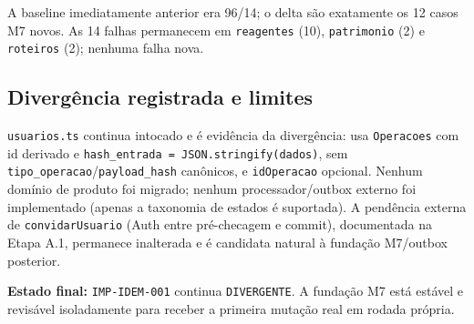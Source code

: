 A baseline imediatamente anterior era 96/14; o delta são exatamente os 12 casos
M7 novos. As 14 falhas permanecem em \texttt{reagentes} (10),
\texttt{patrimonio} (2) e \texttt{roteiros} (2); nenhuma falha nova.

\subsection{Divergência registrada e limites}

\texttt{usuarios.ts} continua intocado e é evidência da divergência: usa
\texttt{Operacoes} com id derivado e \texttt{hash\_entrada =
JSON.stringify(dados)}, sem \texttt{tipo\_operacao}/\texttt{payload\_hash}
canônicos, e \texttt{idOperacao} opcional. Nenhum domínio de produto foi migrado;
nenhum processador/outbox externo foi implementado (apenas a taxonomia de
estados é suportada). A pendência externa de \texttt{convidarUsuario}
(Auth entre pré-checagem e commit), documentada na Etapa A.1, permanece
inalterada e é candidata natural à fundação M7/outbox posterior.

\textbf{Estado final:} \texttt{IMP-IDEM-001} continua \texttt{DIVERGENTE}. A
fundação M7 está estável e revisável isoladamente para receber a primeira
mutação real em rodada própria.
